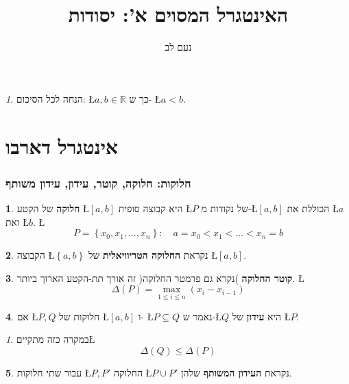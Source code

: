 \documentclass[english,hebrew]{article}
\theoremstyle{remark}
\newtheorem*{rem*}{\protect\remarkname}
\theoremstyle{definition}
\newtheorem*{defn*}{\protect\definitionname}
\theoremstyle{plain}
\theoremstyle{remark}
\newtheorem{claim}[thm]{\protect\claimname}
\theoremstyle{plain}
\theoremstyle{plain}
\providecommand{\claimname}{טענה}
\providecommand{\definitionname}{הגדרה}
\providecommand{\remarkname}{הערה}
\begin{document}
\title{האינטגרל המסוים א': יסודות}
\author{נעם לב}

\maketitle
\tableofcontents{}

\newpage{}
\begin{rem*}
הנחה לכל הסיכום: \L{$a,b\in\mathbb{R}$} כך ש- \L{$a<b$}.
\end{rem*}

\part{אינטגרל דארבו}

\section{חלוקות: חלוקה, קוטר, עידון, עידון משותף}
\begin{defn*}
\textbf{חלוקה} של הקטע \L{$\left[a,b\right]$} היא קבוצה סופית \L{$P$}
של נקודות מ-\L{$\left[a,b\right]$} הכוללת את \L{$a$} ואת \L{$b$}.
\L{%
\[
P=\left\{ x_{0},x_{1},\dots,x_{n}\right\} :\quad a=x_{0}<x_{1}<\dots<x_{n}=b
\]
}%
\end{defn*}
\begin{defn*}
הקבוצה \L{$\left\{ a,b\right\} $} נקראת \textbf{החלוקה הטריוויאלית
}של \L{$\left[a,b\right]$}.
\end{defn*}
\begin{defn*}
\textbf{קוטר החלוקה })נקרא גם פרמטר החלוקה( זה אורך תת-הקטע הארוך
ביותר. \L{%
\[
\Delta\left(P\right)=\underset{1\le i\le n}{\max}\left(x_{i}-x_{i-1}\right)
\]
}%
\end{defn*}
\begin{defn*}
אם \L{$P,Q$} חלוקות של \L{$\left[a,b\right]$} ו- \L{$P\subseteq Q$}
נאמר ש-\L{$Q$} היא \textbf{עידון} של \L{$P$}.
\end{defn*}
\begin{claim}
במקרה כזה מתקיים\L{%
\[
\Delta\left(Q\right)\le\Delta\left(P\right)
\]
}%
\end{claim}

\begin{defn*}
עבור שתי חלוקות \L{$P,P'$} החלוקה \L{$P\cup P'$} נקראת \textbf{העידון
המשותף} שלהן.
\end{defn*}
\end{document}
